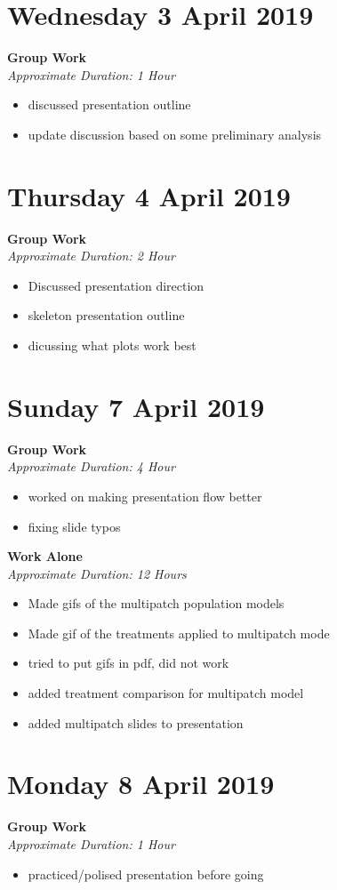 \documentclass[12pt]{article}\usepackage[]{graphicx}\usepackage[]{color}
\begin{document}
\section*{Wednesday 3 April 2019}
\textbf{Group Work} \\
\emph{Approximate Duration: 1 Hour}
\begin{itemize}
    \item discussed presentation outline
    \item update discussion based on some preliminary analysis
\end{itemize}
\section*{Thursday 4 April 2019}
\textbf{Group Work} \\
\emph{Approximate Duration: 2 Hour}
\begin{itemize}
    \item Discussed presentation direction
    \item skeleton presentation outline
    \item dicussing what plots work best
\end{itemize}
\section*{Sunday 7 April 2019}
\textbf{Group Work} \\
\emph{Approximate Duration: 4 Hour}
\begin{itemize}
    \item worked on making presentation flow better
    \item fixing slide typos
\end{itemize}
\textbf{Work Alone} \\
\emph{Approximate Duration: 12 Hours}
\begin{itemize}
    \item Made gifs of the multipatch population models
    \item Made gif of the treatments applied to multipatch mode
    \item tried to put gifs in pdf, did not work
    \item added treatment comparison for multipatch model
    \item added multipatch slides to presentation
\end{itemize}
\section*{Monday 8 April 2019}
\textbf{Group Work} \\
\emph{Approximate Duration: 1 Hour}
\begin{itemize}
    \item practiced/polised presentation before going
\end{itemize}
\end{document}
